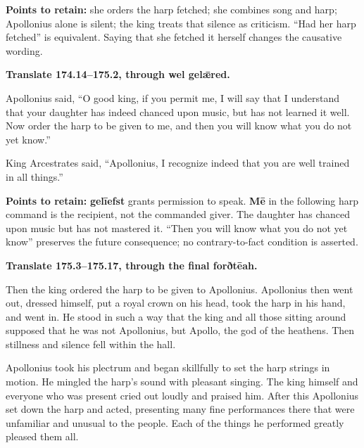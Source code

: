 \textbf{Points to retain:} she orders the harp fetched; she combines song and harp; Apollonius alone is silent; the king treats that silence as criticism. “Had her harp fetched” is equivalent. Saying that she fetched it herself changes the causative wording.

\textbf{Translate 174.14–175.2, through wel gelǣred.}

Apollonius said, “O good king, if you permit me, I will say that I understand that your daughter has indeed chanced upon music, but has not learned it well. Now order the harp to be given to me, and then you will know what you do not yet know.”

King Arcestrates said, “Apollonius, I recognize indeed that you are well trained in all things.”

\textbf{Points to retain:} \textbf{gelīefst} grants permission to speak. \textbf{Mē} in the following harp command is the recipient, not the commanded giver. The daughter has chanced upon music but has not mastered it. “Then you will know what you do not yet know” preserves the future consequence; no contrary-to-fact condition is asserted.

\textbf{Translate 175.3–175.17, through the final forðtēah.}

Then the king ordered the harp to be given to Apollonius. Apollonius then went out, dressed himself, put a royal crown on his head, took the harp in his hand, and went in. He stood in such a way that the king and all those sitting around supposed that he was not Apollonius, but Apollo, the god of the heathens. Then stillness and silence fell within the hall.

Apollonius took his plectrum and began skillfully to set the harp strings in motion. He mingled the harp's sound with pleasant singing. The king himself and everyone who was present cried out loudly and praised him. After this Apollonius set down the harp and acted, presenting many fine performances there that were unfamiliar and unusual to the people. Each of the things he performed greatly pleased them all.

